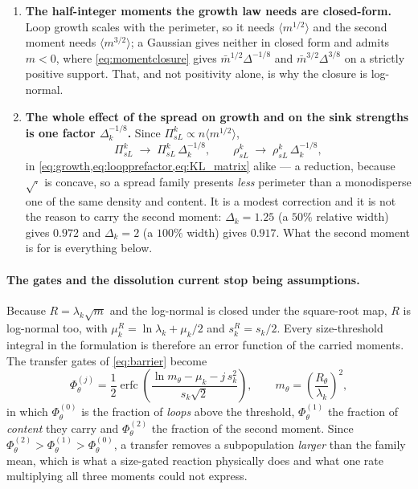 \documentclass{article}
\begin{document}
\begin{enumerate}
\item \textbf{The half-integer moments the growth law needs are closed-form.}
      Loop growth scales with the perimeter, so it needs $\langle m^{1/2}\rangle$
      and the second moment needs $\langle m^{3/2}\rangle$; a Gaussian gives
      neither in closed form and admits $m<0$, where \cref{eq:momentclosure}
      gives $\bar m^{1/2}\Delta^{-1/8}$ and $\bar m^{3/2}\Delta^{3/8}$ on a
      strictly positive support. That, and not positivity alone, is why the
      closure is log-normal.
\item \textbf{The whole effect of the spread on growth and on the sink strengths
      is one factor $\Delta_k^{-1/8}$.} Since
      $\Pi^k_{sL}\propto n\langle m^{1/2}\rangle$,
      \begin{equation}
        \Pi^k_{sL}\;\longrightarrow\;\Pi^k_{sL}\,\Delta_k^{-1/8},
        \qquad
        \rho^k_{sL}\;\longrightarrow\;\rho^k_{sL}\,\Delta_k^{-1/8},
        \label{eq:Deltacorrection}
      \end{equation}
      in \cref{eq:growth,eq:loopprefactor,eq:KL_matrix} alike --- a reduction,
      because $\sqrt{\cdot}$ is concave, so a spread family presents
      \emph{less} perimeter than a monodisperse one of the same density and
      content. It is a modest correction and it is not the reason to carry the
      second moment: $\Delta_k=1.25$ (a $50\%$ relative width) gives $0.972$ and
      $\Delta_k=2$ (a $100\%$ width) gives $0.917$. What the second moment is
      for is everything below.
\end{enumerate}

\paragraph{The gates and the dissolution current stop being assumptions.} Because
$R=\lambda_k\sqrt m$ and the log-normal is closed under the square-root map,
$R$ is log-normal too, with $\mu^R_k=\ln\lambda_k+\mu_k/2$ and $s^R_k=s_k/2$.
Every size-threshold integral in the formulation is therefore an error function
of the carried moments. The transfer gates of \cref{eq:barrier} become
\begin{equation}
  \Phi^{(j)}_{\theta}
   =\frac12\operatorname{erfc}\!
     \left(\frac{\ln m_\theta-\mu_k-j\,s_k^{2}}{s_k\sqrt2}\right),
  \qquad
  m_\theta=\left(\frac{R_\theta}{\lambda_k}\right)^{2},
  \label{eq:gatefraction}
\end{equation}
in which $\Phi^{(0)}_\theta$ is the fraction of \emph{loops} above the threshold,
$\Phi^{(1)}_\theta$ the fraction of \emph{content} they carry and
$\Phi^{(2)}_\theta$ the fraction of the second moment. Since
$\Phi^{(2)}_\theta>\Phi^{(1)}_\theta>\Phi^{(0)}_\theta$, a transfer removes a
subpopulation \emph{larger} than the family mean, which is what a size-gated
reaction physically does and what one rate multiplying all three moments could
not express.
\end{document}
